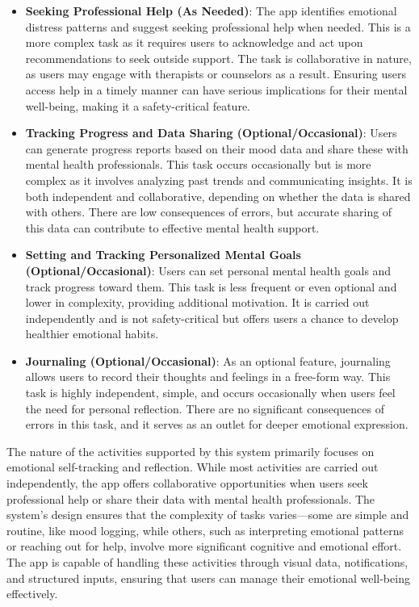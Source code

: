 \begin{itemize}
    \item \textbf{Seeking Professional Help (As Needed)}: The app identifies emotional distress patterns and suggest seeking professional help when needed. This is a more complex task as it requires users to acknowledge and act upon recommendations to seek outside support. The task is collaborative in nature, as users may engage with therapists or counselors as a result. Ensuring users access help in a timely manner can have serious implications for their mental well-being, making it a safety-critical feature.
    \item \textbf{Tracking Progress and Data Sharing (Optional/Occasional)}: Users can generate progress reports based on their mood data and share these with mental health professionals. This task occurs occasionally but is more complex as it involves analyzing past trends and communicating insights. It is both independent and collaborative, depending on whether the data is shared with others. There are low consequences of errors, but accurate sharing of this data can contribute to effective mental health support.
    \item \textbf{Setting and Tracking Personalized Mental Goals (Optional/Occasional)}: Users can set personal mental health goals and track progress toward them. This task is less frequent or even optional and lower in complexity, providing additional motivation. It is carried out independently and is not safety-critical but offers users a chance to develop healthier emotional habits.
    \item \textbf{Journaling (Optional/Occasional)}: As an optional feature, journaling allows users to record their thoughts and feelings in a free-form way. This task is highly independent, simple, and occurs occasionally when users feel the need for personal reflection. There are no significant consequences of errors in this task, and it serves as an outlet for deeper emotional expression.
\end{itemize}

\vspace{5mm}

\noindent The nature of the activities supported by this system primarily focuses on emotional self-tracking and reflection. While most activities are carried out independently, the app offers collaborative opportunities when users seek professional help or share their data with mental health professionals. The system’s design ensures that the complexity of tasks varies—some are simple and routine, like mood logging, while others, such as interpreting emotional patterns or reaching out for help, involve more significant cognitive and emotional effort. The app is capable of handling these activities through visual data, notifications, and structured inputs, ensuring that users can manage their emotional well-being effectively.

